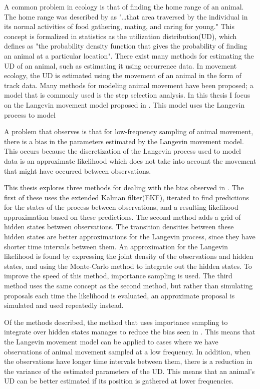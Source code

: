 
A common problem in ecology is that of finding the home range of an animal. The home range was described by \parencite{burt1943territoriality} as "\dots that area traversed by the individual in its normal activities of food gathering, mating, and caring for young." This concept is formalized in statistics as the utilization distribution(UD), which \parencite{anderson1982home} defines as "the probability density function that gives the probability of finding an animal at a particular location". There exist many methods for estimating the UD of an animal, such as estimating it using occurrence data. In movement ecology, the UD is estimated using the movement of an animal in the form of track data. Many methods for modeling animal movement have been proposed; a model that is commonly used is the step selection analysis. In this thesis I focus on the Langevin movement model proposed in \parencite{michelot_langevin_2019}. This model uses the Langevin process to model 


A problem that \parencite{michelot_langevin_2019} observes is that for low-frequency sampling of animal movement, there is a bias in the parameters estimated by the Langevin movement model. This occurs because the discretization of the Langevin process used to model data is an approximate likelihood which does not take into account the movement that might have occurred between observations. 


This thesis explores three methods for dealing with the bias observed in \parencite{michelot_langevin_2019}. The first of these uses the extended Kalman filter(EKF), iterated to find predictions for the states of the process between observations, and a resulting likelihood approximation based on these predictions. The second method adds a grid of hidden states between observations. The transition densities between these hidden states are better approximations for the Langevin process, since they have shorter time intervals between them. An approximation for the Langevin likelihood is found by expressing the joint density of the observations and hidden states, and using the Monte-Carlo method to integrate out the hidden states. To improve the speed of this method, importance sampling is used. The third method uses the same concept as the second method, but rather than simulating proposals each time the likelihood is evaluated, an approximate proposal is simulated and used repeatedly instead. 


Of the methods described, the method that uses importance sampling to integrate over hidden states manages to reduce the bias seen in \parencite{michelot_langevin_2019}. This means that the Langevin movement model can be applied to cases where we have observations of animal movement sampled at a low frequency. In addition, when the observations have longer time intervals between them, there is a reduction in the variance of the estimated parameters of the UD. This means that an animal's UD can be better estimated if its position is gathered at lower frequencies.










